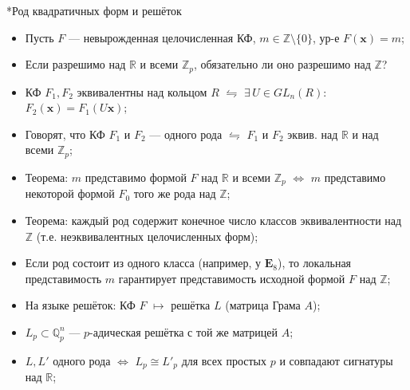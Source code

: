 \documentclass[serif, aspectratio=169]{beamer}
\begin{document}
\begin{frame}{*Род квадратичных форм и решёток}
    \begin{itemize}
        \item Пусть $F$ --- невырожденная целочисленная КФ, $m\in\mathbb{Z}\setminus\{0\}$, ур-е $F(\mathbf{x})=m$;
        \item Если разрешимо над $\mathbb{R}$ и всеми $\mathbb{Z}_p$, обязательно ли оно разрешимо над $\mathbb{Z}$?
        \item КФ $F_1,F_2$ эквивалентны над кольцом $R$ $\leftrightharpoons$ $\exists\, U\in GL_n(R)$: $F_2(\mathbf{x})=F_1(U\mathbf{x})$;
        \item Говорят, что КФ $F_1$ и $F_2$ --- одного рода $\leftrightharpoons$ $F_1$ и $F_2$ эквив. над $\mathbb{R}$ и над всеми $\mathbb{Z}_p$;
        \item Теорема: $m$ представимо формой $F$ над $\mathbb{R}$ и всеми $\mathbb{Z}_p$ $\Leftrightarrow$ $m$ представимо некоторой формой $F_0$ того же рода над $\mathbb{Z}$;
        \item Теорема: каждый род содержит конечное число классов эквивалентности над $\mathbb{Z}$ (т.е. неэквивалентных целочисленных форм);
        \item Если род состоит из одного класса (например, у $\mathbf{E}_8$), то локальная представимость $m$ гарантирует представимость исходной формой $F$ над $\mathbb{Z}$;
        \item На языке решёток: КФ $F$ $\mapsto$ решётка $L$ (матрица Грама $A$); 
        \item $L_p\subset\mathbb{Q}_p^n$ --- $p$-адическая решётка с той же матрицей $A$;
        \item $L,L'$ одного рода $\Leftrightarrow$ $L_p\cong L'_p$ для всех простых $p$ и совпадают сигнатуры над $\mathbb{R}$;
    \end{itemize}

    \note{
        \begin{itemize}
            \item ---
        \end{itemize}
    }
\end{frame}
\end{document}

